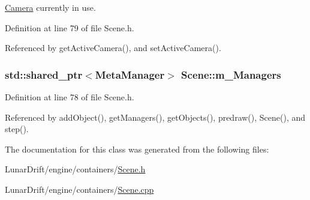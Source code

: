 \hyperlink{class_camera}{Camera} currently in use. 



Definition at line 79 of file Scene.\+h.



Referenced by get\+Active\+Camera(), and set\+Active\+Camera().

\subsubsection[{\texorpdfstring{m\+\_\+\+Managers}{m_Managers}}]{\setlength{\rightskip}{0pt plus 5cm}std\+::shared\+\_\+ptr$<${\bf Meta\+Manager}$>$ Scene\+::m\+\_\+\+Managers\hspace{0.3cm}{\ttfamily [private]}}\hypertarget{class_scene_a40f1ffc374bb488c2ec2599289793316}{}\label{class_scene_a40f1ffc374bb488c2ec2599289793316}


Definition at line 78 of file Scene.\+h.



Referenced by add\+Object(), get\+Managers(), get\+Objects(), predraw(), Scene(), and step().



The documentation for this class was generated from the following files\+:\begin{DoxyCompactItemize}
\item 
Lunar\+Drift/engine/containers/\hyperlink{_scene_8h}{Scene.\+h}\item 
Lunar\+Drift/engine/containers/\hyperlink{_scene_8cpp}{Scene.\+cpp}\end{DoxyCompactItemize}
